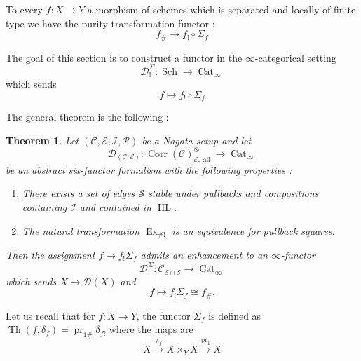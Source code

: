 \documentclass[14pt]{article}
\newtheorem{theorem}{Theorem}[subsection]
\theoremstyle{definition}
\newcommand{\E}{\mathcal{E}}
\newcommand{\D}{\mathcal{D}}
\renewcommand{\P}{\mathcal{P}}
\newcommand{\op}[1]{\operatorname{#1}}
\newcommand{\I}{\mathscr{I}}
\newcommand{\Ca}{\mathcal{C}}
\numberwithin{subsection}{section}
\begin{document}
To every $f : X \to Y$ a morphism of schemes which is separated and locally of finite type we have the purity transformation functor :
\begin{equation}
    f_{\#} \to f_! \circ \Sigma_f
\end{equation}

The goal of this section is to construct a functor in the $\infty$-categorical setting 
\begin{equation}
    \D_{!}^{\Sigma} : \op{Sch} \to \op{Cat}_{\infty}
\end{equation}
which sends 
\begin{equation}
    f \longmapsto f_! \circ \Sigma_f
\end{equation}

The general theorem is the following : 

\begin{theorem} \label{puritysigmaequvialencefunctorial}
    Let $(\Ca,\E,\I,\P)$ be a Nagata setup and let 
    \begin{equation}
        \D_{(\Ca,\E)}:  \op{Corr}(\Ca)^{\otimes}_{\E,\op{all}} \to \op{Cat}_{\infty}
         \end{equation}
        be an abstract six-functor formalism with the following properties :
        \begin{enumerate}
            \item There exists a set of edges $\mathcal{S}$ stable under pullbacks and compositions containing $\I$ and contained in $\op{HL}$.
            \item The natural transformation $\op{Ex}_{\#!}$ is an equivalence for pullback squares.
            \end{enumerate}
        Then the assignment $ f \mapsto f_!\Sigma_f$ admits an enhancement to an $\infty$-functor 
        \begin{equation}
            \D^{\Sigma}_! : \Ca_{\E \cap \mathcal{S}} \to \op{Cat}_{\infty}
        \end{equation}
        which sends $X \mapsto \D(X)$
 and 
 \begin{equation}
     f \longmapsto f_!\Sigma_f \cong f_{\#}.
 \end{equation}
    
    \end{theorem}



Let us recall that for $f : X \to Y$, the functor  $\Sigma_f$ is defined as $\op{Th}(f,\delta_f)= \op{pr}_{1\#}\delta_{f!}$ where the maps are 
\begin{equation}
    X \xrightarrow{\delta_f} X \times_Y X \xrightarrow{\op{pr}_1} X
\end{equation}
\end{document}
